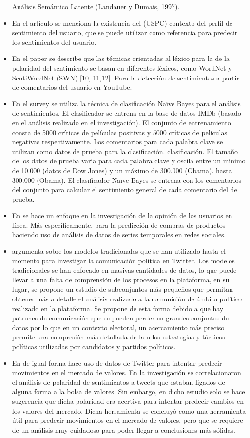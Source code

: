 \documentclass[12pt, conference]{IEEEtran}
\begin{document}
\begin{itemize}
 Análisis Semántico Latente (Landauer y Dumais, 1997).
 \item En el artículo \cite{r7} se menciona la existencia del (USPC) contexto del perfil de sentimiento
 del usuario, que se puede utilizar como referencia para predecir los sentimientos del usuario.
 \item En el paper \cite{r8}  se describe que las técnicas orientadas al léxico para la
 de la polaridad del sentimiento se basan en 
 diferentes léxicos, como WordNet y
 SentiWordNet (SWN) [10, 11,12]. Para la detección de sentimientos a partir de comentarios del usuario en YouTube.
 \item En el survey \cite{r9} se utiliza la técnica de clasificación Naïve Bayes para el análisis de sentimientos. El clasificador se entrena en la
 base de datos IMDb (basado en el análisis realizado en el
 investigación). El conjunto de entrenamiento consta de 5000 críticas de películas positivas y
 5000 críticas de películas negativas respectivamente. Los comentarios
 para cada palabra clave se utilizan como datos de prueba para la clasificación.
 clasificación. El tamaño de los datos de prueba varía para cada palabra clave y oscila entre un mínimo de 10.000 (datos de Dow Jones) y un máximo de 300.000 (Obama).
 hasta 300.000 (Obama). El clasificador Naïve Bayes se entrena con los comentarios del conjunto
 para calcular el sentimiento general de cada comentario del
 de prueba.
 \item En \cite{r19} se hace un enfoque en la investigación de la opinión de los usuarios en línea. Más específicamente, para la predicción de compras de productos haciendo uso de análisis de datos de series temporales en redes sociales.
 \item \cite{r18} argumenta sobre los modelos tradicionales que se han utilizado hasta el momento para investigar la comunicación política en Twitter. Los modelos tradicionales se han enfocado en masivas cantidades de datos, lo que puede llevar a una falta de comprensión de los procesos en la plataforma, en su lugar, se propone un estudio de subconjuntos más pequeños que permitan obtener más a detalle el análisis realizado a la comunición de ámbito político realizado en la plataforma. Se propone de esta forma debido a que hay patrones de comunicación que se pueden perder en grandes conjuntos de datos por lo que en un contexto electoral, un acercamiento más preciso permite una compresión más detallada de la o las estrategias y tácticas políticas utilizadas por candidatos y partidos políticos.
 \item En \cite{r17} de igual forma hace uso de datos de Twitter para intentar predecir movimientos en el mercado de valores. En la investigación se correlacionaron el análisis de polaridad de sentimientos a tweets que estaban ligados de alguna forma a la bolsa de valores. Sin embargo, en dicho estudio solo se hace sugerencia que dicha polaridad era acertiva para intentar predecir cambios en los valores del mercado. Dicha herramienta se concluyó como una herramienta útil para predecir movimientos en el mercado de valores, pero que se requiere de un análisis muy cuidadoso para poder llegar a conclusiones más sólidas.

\end{itemize}
\end{document}
